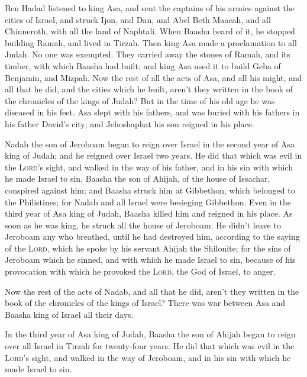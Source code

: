  Ben Hadad listened to king Asa, and sent the captains of
his armies against the cities of Israel, and struck Ijon, and Dan, and
Abel Beth Maacah, and all Chinneroth, with all the land of Naphtali.
 When Baasha heard of it, he stopped building Ramah, and
lived in Tirzah.  Then king Asa made a proclamation to
all Judah. No one was exempted. They carried away the stones of Ramah,
and its timber, with which Baasha had built; and king Asa used it to
build Geba of Benjamin, and Mizpah.  Now the rest of all
the acts of Asa, and all his might, and all that he did, and the cities
which he built, aren't they written in the book of the chronicles of the
kings of Judah? But in the time of his old age he was diseased in his
feet.  Asa slept with his fathers, and was buried with
his fathers in his father David's city; and Jehoshaphat his son reigned
in his place.

 Nadab the son of Jeroboam began to reign over Israel in
the second year of Asa king of Judah; and he reigned over Israel two
years.  He did that which was evil in the \textsc{Lord}'s
sight, and walked in the way of his father, and in his sin with which he
made Israel to sin.  Baasha the son of Ahijah, of the
house of Issachar, conspired against him; and Baasha struck him at
Gibbethon, which belonged to the Philistines; for Nadab and all Israel
were besieging Gibbethon.  Even in the third year of Asa
king of Judah, Baasha killed him and reigned in his place.
 As soon as he was king, he struck all the house of
Jeroboam. He didn't leave to Jeroboam any who breathed, until he had
destroyed him, according to the saying of the \textsc{Lord}, which he
spoke by his servant Ahijah the Shilonite;  for the sins
of Jeroboam which he sinned, and with which he made Israel to sin,
because of his provocation with which he provoked the \textsc{Lord}, the
God of Israel, to anger.

 Now the rest of the acts of Nadab, and all that he did,
aren't they written in the book of the chronicles of the kings of
Israel?  There was war between Asa and Baasha king of
Israel all their days.

 In the third year of Asa king of Judah, Baasha the son
of Ahijah began to reign over all Israel in Tirzah for twenty-four
years.  He did that which was evil in the \textsc{Lord}'s
sight, and walked in the way of Jeroboam, and in his sin with which he
made Israel to sin.

